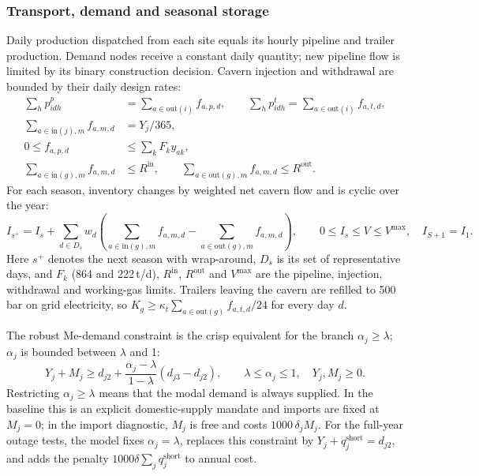\subsubsection{Transport, demand and seasonal storage}
Daily production dispatched from each site equals its hourly pipeline and
trailer production. Demand nodes receive a constant daily quantity; new
pipeline flow is limited by its binary construction decision. Cavern injection
and withdrawal are bounded by their daily design rates:
\begin{equation}
\begin{aligned}
\sum_h p^p_{idh}&=\sum_{a\in\mathrm{out}(i)}f_{a,p,d},\qquad
\sum_h p^t_{idh}=\sum_{a\in\mathrm{out}(i)}f_{a,t,d},\\
\sum_{a\in\mathrm{in}(j),m}f_{a,m,d}&=Y_j/365,\\
0\le f_{a,p,d}&\le \textstyle\sum_k F_k y_{ak},\\
\sum_{a\in\mathrm{in}(g),m}f_{a,m,d}&\le R^{\mathrm{in}},\qquad
\sum_{a\in\mathrm{out}(g),m}f_{a,m,d}\le R^{\mathrm{out}}.
\end{aligned}
\label{eq:s5_flow}
\end{equation}
For each season, inventory changes by weighted net cavern flow and is cyclic
over the year:
\begin{equation}
I_{s^+}=I_s+\sum_{d\in D_s}w_d\left(
\sum_{a\in\mathrm{in}(g),m}f_{a,m,d}-
\sum_{a\in\mathrm{out}(g),m}f_{a,m,d}\right),\qquad
0\le I_s\le V\le V^{\max},\quad I_{S+1}=I_1.
\label{eq:s5_inventory}
\end{equation}
Here $s^+$ denotes the next season with wrap-around, $D_s$ is its set of
representative days, and $F_k$ (864 and 222\,t/d), $R^{\mathrm{in}}$, $R^{\mathrm{out}}$ and
$V^{\max}$ are the pipeline, injection, withdrawal and working-gas limits. Trailers leaving the
cavern are refilled to 500\,bar on grid electricity, so
$K_g\ge\kappa_t\sum_{a\in\mathrm{out}(g)}f_{a,t,d}/24$ for every day $d$.

The robust Me-demand constraint is the crisp equivalent for the branch
$\alpha_j\ge\lambda$; $\alpha_j$ is bounded between $\lambda$ and 1:
\begin{equation}
Y_j+M_j\ge d_{j2}+\frac{\alpha_j-\lambda}{1-\lambda}
(d_{j3}-d_{j2}),\qquad \lambda\le\alpha_j\le1,\quad Y_j,M_j\ge0.
\label{eq:s5_demand}
\end{equation}
Restricting $\alpha_j\ge\lambda$ means that the modal demand is always supplied. In the baseline this
is an explicit domestic-supply mandate and imports are fixed at $M_j=0$; in the import diagnostic,
$M_j$ is free and costs $1000\,\delta_j M_j$.
For the full-year outage tests, the model fixes $\alpha_j=\lambda$, replaces
this constraint by $Y_j+q_j^{\mathrm{short}}=d_{j2}$, and adds the penalty
$1000\delta\sum_j q_j^{\mathrm{short}}$ to annual cost.

